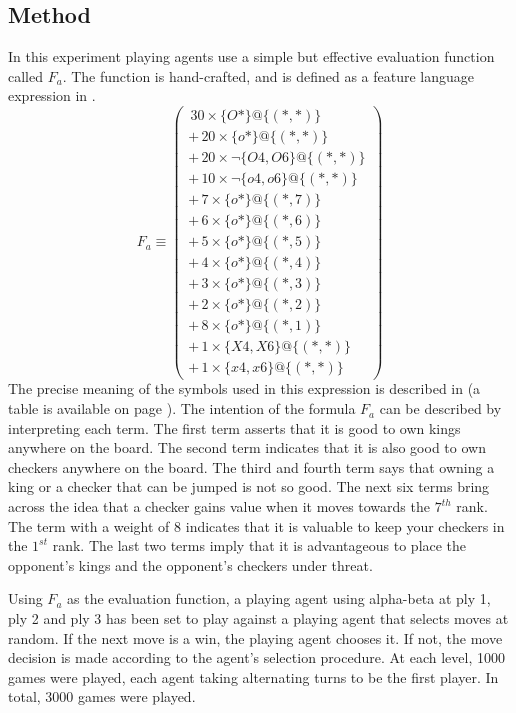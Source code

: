 \subsection*{Method}
In this experiment  playing agents use a simple but effective evaluation function called $F_a$.  The function is hand-crafted, and is defined as a feature language expression in .  
\begin{equation}
 F_a \equiv \left( 
\begin{array}{l}
  \, 30 \times \{O*\} @ \{(*,*)\}  \\
+ \, 20 \times \{o*\} @ \{(*,*)\}  \\
+ \, 20 \times \neg \{O4,O6\} @ \{(*,*)\}  \\
+ \, 10 \times \neg \{o4,o6\} @ \{(*,*)\}  \\
+ \, 7 \times \{o*\} @ \{ (*,7) \}  \\
+	\, 6 \times \{o*\} @ \{ (*,6) \}  \\
+	\, 5 \times \{o*\} @ \{ (*,5) \} \\
+	\, 4 \times \{o*\} @ \{ (*,4) \} \\
+	\, 3 \times \{o*\} @ \{ (*,3) \} \\
+	\, 2 \times \{o*\} @ \{ (*,2) \} \\ 
+	\, 8 \times \{o*\} @ \{ (*,1) \} \\
+ \, 1 \times \{X4,X6 \} @ \{(*,*)\}  \\
+ \, 1 \times \{x4,x6 \} @ \{(*,*)\}  
\end{array}
\right)
\label{eq:tree-fa}
\end{equation}
The precise meaning of the symbols used in this expression is described in  (a table is available on page \pageref{tab:symbols}). The intention of the formula $F_a$ can be described by interpreting each term.  The first term asserts that it is good to own kings anywhere on the board.  The second term indicates that it is also good to own checkers anywhere on the board.  The third and fourth term says that owning a king or a checker that can be jumped is not so good.  The next six terms bring across the idea that a checker gains value when it moves towards the $7^{th}$ rank.  The term with a weight of $8$ indicates that it is valuable to keep your checkers in the $1^{st}$ rank.  The last two terms imply that it is advantageous to place the opponent's kings and the opponent's checkers under threat.      

Using $F_a$ as the evaluation function, a playing agent using alpha-beta at ply 1, ply 2 and ply 3 has been set to play against a playing agent that selects moves at random.  If the next move is a win, the playing agent chooses it.  If not, the move decision is made according to the agent's selection procedure.  At each level, 1000 games were played, each agent taking alternating turns to be the first player.  In total, 3000 games were played.  

